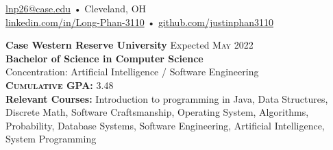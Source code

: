 \documentclass[a4paper,11pt]{article}
\begin{document}
 
 
\begin{center} 
\href{mailto:lnp26@case.edu}{lnp26@case.edu} • Cleveland, OH \\
\href{https://linkedin.com/in/Long-Phan-3110/}{linkedin.com/in/Long-Phan-3110} • \href{http://github.com/justinphan3110}{github.com/justinphan3110}
\noindent\makebox[\linewidth]{\rule{\paperwidth}{2pt}}
\end{center}

\begin{flushleft}
	\textbf{Case Western Reserve University } \hspace{1cm} Expected \textsc{May} 2022 \\
	\textbf{Bachelor of Science in Computer Science} \\
	Concentration: Artificial Intelligence / Software Engineering \\
	\textbf{\textsc{Cumulative GPA:}} 3.48 \\
    \textbf{Relevant Courses:}  Introduction to programming in Java, Data Structures, Discrete Math, Software Craftsmanship, Operating System, Algorithms, Probability, Database Systems,  Software Engineering, Artificial Intelligence, System Programming 
    		
	\centering{\noindent\makebox{\rule{8cm}{1.5pt}}}
\end{flushleft}

\end{document}
